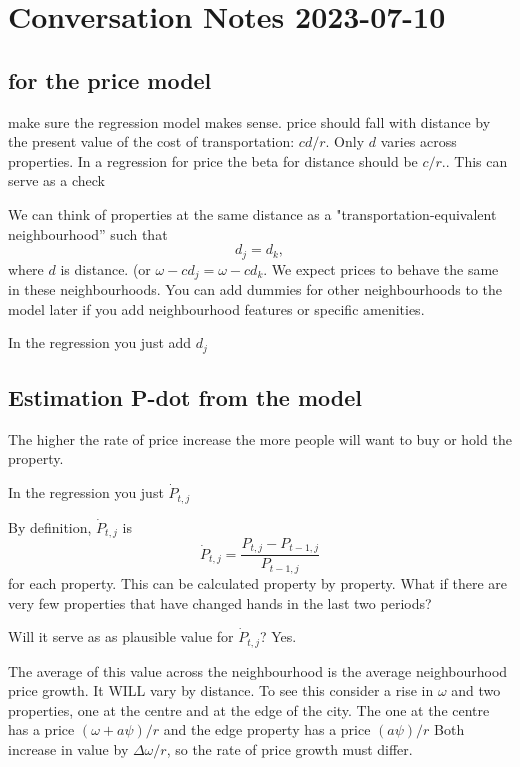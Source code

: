 
\section{Conversation Notes 2023-07-10}
\subsection{for the price model}
make sure the regression model makes sense. price should fall with distance by the present value of the cost of transportation: $cd/r$. Only $d$ varies across properties. In a regression for price the beta for distance should be $c/r$.. This can serve as a check  

We can think of properties at the same distance as a "transportation-equivalent neighbourhood'' such that 
\[d_j=d_k,\]
where $d$ is distance.  (or $\omega-cd_j=\omega-cd_k$.  We expect prices to behave the same in these neighbourhoods. You can add dummies for other neighbourhoods to the model later if you add neighbourhood features or specific amenities. 

In the regression you just add $d_j$

\subsection{Estimation P-dot from the model }
The higher the rate of price increase the more people will want to buy or hold the property. 

In the regression you just  $\dot P_{t,j}$

By definition, $\dot P_{t,j}$ is \[\dot P_{t,j} =\frac{P_{t,j}-P_{t-1,j}}{P_{t-1,j}}\] for each property. This can be calculated property by property. What if there are very few properties that have changed hands  in the last two periods? 


Will it serve as as plausible value for $\dot P_{t,j}$? Yes.

The average of this value across the neighbourhood is the average neighbourhood price growth. It WILL vary by distance. To see this consider a rise in $\omega$ and two properties, one at the centre and at the edge of the city. The one at the centre has a price $(\omega + a\psi)/r$ and the edge property  has a price $(a\psi)/r$ Both increase in value by $\Delta\omega/r$, so the rate of price growth must differ.

